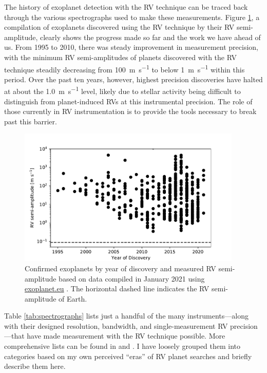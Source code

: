 The history of exoplanet detection with the RV technique can be traced back through the various spectrographs used to make these measurements. Figure \ref{fig:rv-exoplanets}, a compilation of exoplanets discovered using the RV technique by their RV semi-amplitude, clearly shows the progress made so far and the work we have ahead of us. From 1995 to 2010, there was steady improvement in measurement precision, with the minimum RV semi-amplitudes of planets discovered with the RV technique steadily decreasing from 100~\si{\meter\per\second} to below 1~\si{\meter\per\second} within this period. Over the past ten years, however, highest precision discoveries have halted at about the 1.0~\si{\meter\per\second} level, likely due to stellar activity being difficult to distinguish from planet-induced RVs at this instrumental precision. The role of those currently in RV instrumentation is to provide the tools necessary to break past this barrier.

\begin{figure}
    \centering
    \includegraphics[width=0.95\textwidth]{figures-1/rv-exoplanets.pdf}
    \caption[Radial-velocity technique exoplanet discovery timeline]{Confirmed exoplanets by year of discovery and measured RV semi-amplitude based on data compiled in January 2021 using \url{exoplanet.eu} \citep{schneider_defining_2011}. The horizontal dashed line indicates the RV semi-amplitude of Earth.}
    \label{fig:rv-exoplanets}
\end{figure}

Table \ref{tab:spectrographs} lists just a handful of the many instruments---along with their designed resolution, bandwidth, and single-measurement RV precision---that have made measurement with the RV technique possible. More comprehensive lists can be found in \citet{fischer_state_2016} and \citet{wright_third_2017}. I have loosely grouped them into categories based on my own perceived ``eras'' of RV planet searches and briefly describe them here.

